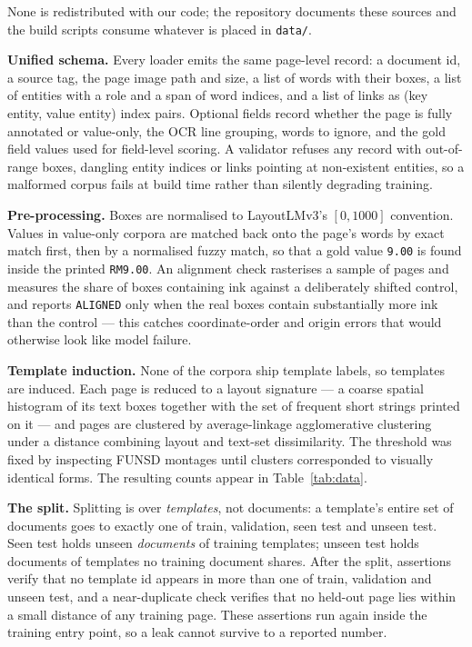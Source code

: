 \documentclass[11pt,a4paper]{article}
\newcommand{\code}[1]{\texttt{\small #1}}
\begin{document}
None is redistributed with our code; the repository documents these sources and the build scripts
consume whatever is placed in \code{data/}.

\textbf{Unified schema.} Every loader emits the same page-level record: a document id, a source
tag, the page image path and size, a list of words with their boxes, a list of entities with a
role and a span of word indices, and a list of links as (key entity, value entity) index pairs.
Optional fields record whether the page is fully annotated or value-only, the OCR line grouping,
words to ignore, and the gold field values used for field-level scoring. A validator refuses any
record with out-of-range boxes, dangling entity indices or links pointing at non-existent
entities, so a malformed corpus fails at build time rather than silently degrading training.

\textbf{Pre-processing.} Boxes are normalised to LayoutLMv3's $[0,1000]$ convention. Values in
value-only corpora are matched back onto the page's words by exact match first, then by a
normalised fuzzy match, so that a gold value \code{9.00} is found inside the printed
\code{RM9.00}. An alignment check rasterises a sample of pages and measures the share of boxes
containing ink against a deliberately shifted control, and reports \code{ALIGNED} only when the
real boxes contain substantially more ink than the control --- this catches coordinate-order
and origin errors that would otherwise look like model failure.

\textbf{Template induction.} None of the corpora ship template labels, so templates are induced.
Each page is reduced to a layout signature --- a coarse spatial histogram of its text boxes
together with the set of frequent short strings printed on it --- and pages are clustered by
average-linkage agglomerative clustering under a distance combining layout and text-set
dissimilarity. The threshold was fixed by inspecting FUNSD montages until clusters corresponded
to visually identical forms. The resulting counts appear in Table~\ref{tab:data}.

\textbf{The split.} Splitting is over \emph{templates}, not documents: a template's entire set of
documents goes to exactly one of train, validation, seen test and unseen test. Seen test holds
unseen \emph{documents} of training templates; unseen test holds documents of templates no
training document shares. After the split, assertions verify that no template id appears in more
than one of train, validation and unseen test, and a near-duplicate check verifies that no
held-out page lies within a small distance of any training page. These assertions run again
inside the training entry point, so a leak cannot survive to a reported number.
\end{document}
